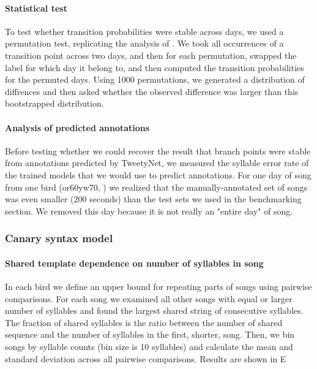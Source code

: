 \documentclass[9pt,lineno]{elife}
\begin{document}
\paragraph{Statistical test}
To test whether transition probabilities were stable across days, 
we used a permutation test, 
replicating the analysis of \cite{warren_variable_2012}. 
We took all occurrences of a transition point across two days, 
and then for each permutation, swapped the label for which day it belong to, 
and then computed the transition probabilities for the permuted days. 
Using 1000 permutations, we generated a distribution of diffrences 
and then asked whether the observed difference 
was larger than this bootstrapped distribution.

\paragraph{Analysis of predicted annotations}
Before testing whether we could recover the result that branch points were stable 
from annotations predicted by TweetyNet, we measured the syllable error rate 
of the trained models that we would use to predict annotations.
For one day of song from one bird (or60yw70, ) we realized that 
the manually-annotated set of songs was even smaller (200 seconds) 
than the test sets we used in the benchmarking section. 
We removed this day because it is not really an "entire day" of song.

\subsubsection{Canary syntax model}

\paragraph{Shared template dependence on number of syllables in song}
In each bird we define an upper bound for repeating parts of songs using pairwise comparisons. For each song we examined all other songs with equal or larger number of syllables and found the largest shared string of consecutive syllables. The fraction of shared syllables is the ratio between the number of shared sequence and the number of syllables in the first, shorter, song. Then, we bin songs by syllable counts (bin size is 10 syllables) and calculate the mean and standard deviation across all pairwise comparisons. Results are shown in E 
\end{document}
